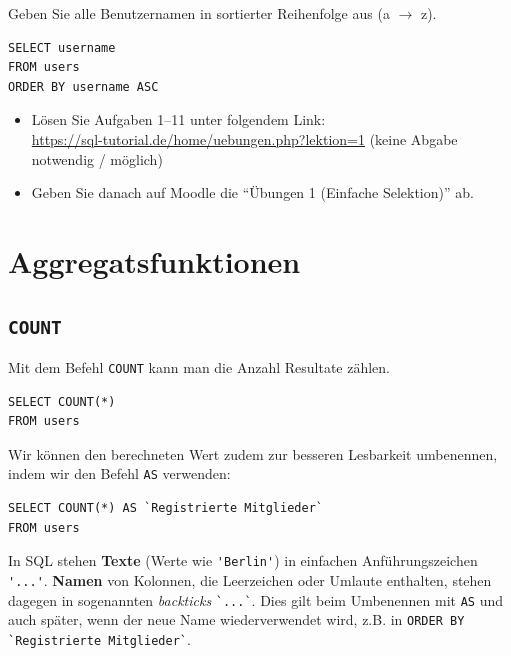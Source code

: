 \begin{myexercise}
  Geben Sie alle Benutzernamen in sortierter Reihenfolge aus (a $\rightarrow$ z).
  \begin{myanswer}
    \begin{lstlisting}
SELECT username
FROM users
ORDER BY username ASC
\end{lstlisting}
  \end{myanswer}
\end{myexercise}

\begin{myexercise}
  \begin{itemize}
    \item Lösen Sie Aufgaben 1--11 unter folgendem Link:\\
\url{https://sql-tutorial.de/home/uebungen.php?lektion=1} (keine Abgabe notwendig / möglich)
    \item Geben Sie danach auf Moodle die \enquote{Übungen 1 (Einfache Selektion)} ab.
  \end{itemize}
\end{myexercise}

\section{Aggregatsfunktionen}

\subsection{\texorpdfstring{\lstinline|COUNT|}{COUNT}}

Mit dem Befehl \lstinline|COUNT| kann man die Anzahl Resultate zählen.

\begin{lstlisting}
SELECT COUNT(*)
FROM users
\end{lstlisting}

Wir können den berechneten Wert zudem zur besseren Lesbarkeit umbenennen, indem wir den Befehl \lstinline|AS| verwenden:

\begin{lstlisting}
SELECT COUNT(*) AS `Registrierte Mitglieder`
FROM users
\end{lstlisting}

\begin{mycaution}\label{mycaution:backticks}
  In \gls{SQL} stehen \textbf{Texte} (Werte wie \lstinline|'Berlin'|) in einfachen Anführungszeichen \lstinline|'...'|. \textbf{Namen} von Kolonnen, die Leerzeichen oder Umlaute enthalten, stehen dagegen in sogenannten \textit{backticks} \lstinline|`...`|. Dies gilt beim Umbenennen mit \lstinline|AS| und auch später, wenn der neue Name wiederverwendet wird, z.B. in \lstinline|ORDER BY `Registrierte Mitglieder`|.
\end{mycaution}

